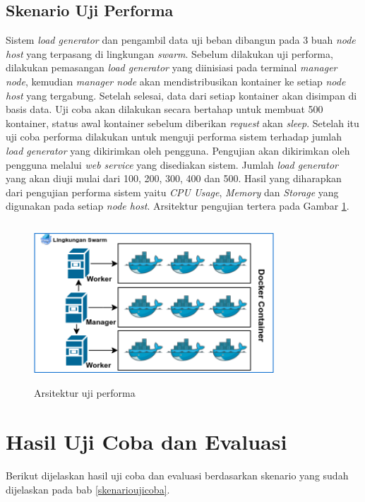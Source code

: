 	\subsection{Skenario Uji Performa} \label{skenujiperforma}
		Sistem \textit{load generator} dan pengambil data uji beban dibangun pada 3 buah \textit{node host} yang terpasang di lingkungan \textit{swarm}.  Sebelum dilakukan uji performa, dilakukan pemasangan \textit{load generator} yang diinisiasi pada terminal \textit{manager node}, kemudian \textit{manager node} akan mendistribusikan kontainer ke setiap \textit{node host} yang tergabung. Setelah selesai, data dari setiap kontainer akan disimpan di basis data. Uji coba akan dilakukan secara bertahap untuk membuat 500 kontainer, status awal kontainer sebelum diberikan \textit{request} akan \textit{sleep}. Setelah itu uji coba performa dilakukan untuk menguji performa sistem terhadap jumlah \textit{load generator} yang dikirimkan oleh pengguna. Pengujian akan dikirimkan oleh pengguna melalui \textit{web service} yang disediakan sistem. Jumlah \textit{load generator} yang akan diuji mulai dari 100, 200, 300, 400 dan 500. Hasil yang diharapkan dari pengujian performa sistem yaitu \textit{CPU Usage}, \textit{Memory} dan \textit{Storage} yang digunakan pada setiap \textit{node host}. Arsitektur pengujian tertera pada Gambar \ref{ujiperforma}.
		\begin{figure}[H]
			\centering
			\includegraphics[width=9cm,height=6cm]{Images/C-5/performa.png}
			\caption{Arsitektur uji performa}
			\label{ujiperforma}
		\end{figure}
	
	\section{Hasil Uji Coba dan Evaluasi}
		Berikut dijelaskan hasil uji coba dan evaluasi berdasarkan skenario yang sudah dijelaskan pada bab \ref{skenarioujicoba}.
		
